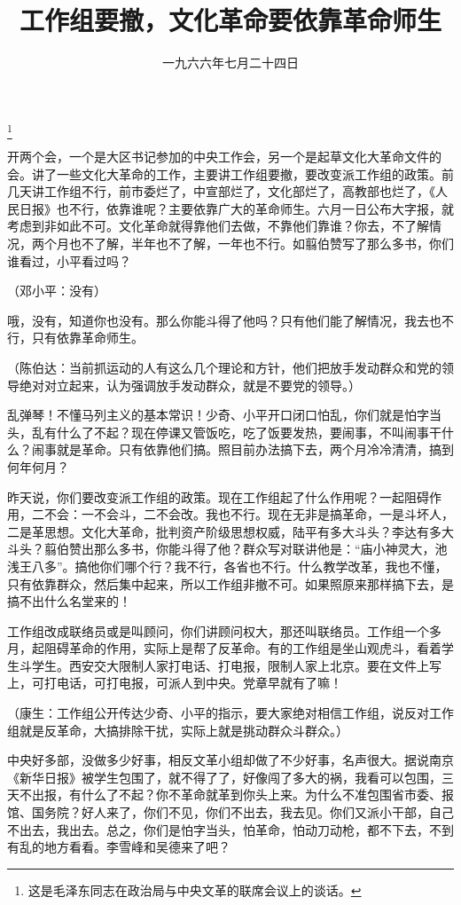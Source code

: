 
\title{工作组要撤，文化革命要依靠革命师生}
\date{一九六六年七月二十四日}
\thanks{这是毛泽东同志在政治局与中央文革的联席会议上的谈话。}
\maketitle


开两个会，一个是大区书记参加的中央工作会，另一个是起草文化大革命文件的会。讲了一些文化大革命的工作，主要讲工作组要撤，要改变派工作组的政策。前几天讲工作组不行，前市委烂了，中宣部烂了，文化部烂了，高教部也烂了，《人民日报》也不行，依靠谁呢？主要依靠广大的革命师生。六月一日公布大字报，就考虑到非如此不可。文化革命就得靠他们去做，不靠他们靠谁？你去，不了解情况，两个月也不了解，半年也不了解，一年也不行。如翦伯赞写了那么多书，你们谁看过，小平看过吗？

（邓小平：没有）

哦，没有，知道你也没有。那么你能斗得了他吗？只有他们能了解情况，我去也不行，只有依靠革命师生。

（陈伯达：当前抓运动的人有这么几个理论和方针，他们把放手发动群众和党的领导绝对对立起来，认为强调放手发动群众，就是不要党的领导。）

乱弹琴！不懂马列主义的基本常识！少奇、小平开口闭口怕乱，你们就是怕字当头，乱有什么了不起？现在停课又管饭吃，吃了饭要发热，要闹事，不叫闹事干什么？闹事就是革命。只有依靠他们搞。照目前办法搞下去，两个月冷冷清清，搞到何年何月？

昨天说，你们要改变派工作组的政策。现在工作组起了什么作用呢？一起阻碍作用，二不会：一不会斗，二不会改。我也不行。现在无非是搞革命，一是斗坏人，二是革思想。文化大革命，批判资产阶级思想权威，陆平有多大斗头？李达有多大斗头？翦伯赞出那么多书，你能斗得了他？群众写对联讲他是：“庙小神灵大，池浅王八多”。搞他你们哪个行？我不行，各省也不行。什么教学改革，我也不懂，只有依靠群众，然后集中起来，所以工作组非撤不可。如果照原来那样搞下去，是搞不出什么名堂来的！

工作组改成联络员或是叫顾问，你们讲顾问权大，那还叫联络员。工作组一个多月，起阻碍革命的作用，实际上是帮了反革命。有的工作组是坐山观虎斗，看着学生斗学生。西安交大限制人家打电话、打电报，限制人家上北京。要在文件上写上，可打电话，可打电报，可派人到中央。党章早就有了嘛！

（康生：工作组公开传达少奇、小平的指示，要大家绝对相信工作组，说反对工作组就是反革命，大搞排除干扰，实际上就是挑动群众斗群众。）

中央好多部，没做多少好事，相反文革小组却做了不少好事，名声很大。据说南京《新华日报》被学生包围了，就不得了了，好像闯了多大的祸，我看可以包围，三天不出报，有什么了不起？你不革命就革到你头上来。为什么不准包围省市委、报馆、国务院？好人来了，你们不见，你们不出去，我去见。你们又派小干部，自己不出去，我出去。总之，你们是怕字当头，怕革命，怕动刀动枪，都不下去，不到有乱的地方看看。李雪峰和吴德来了吧？

